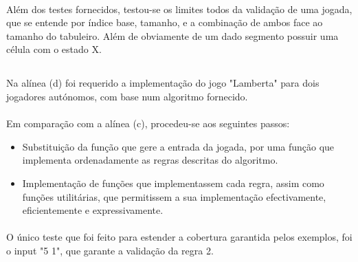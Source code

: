 \paragraph{} Além dos testes fornecidos, testou-se os limites todos da
validação de uma jogada, que se entende por índice base, tamanho, e a
combinação de ambos face ao tamanho do tabuleiro. Além de obviamente de um
dado segmento possuir uma célula com o estado X.

\newpage

\subsection{}

\paragraph{} Na alínea (d) foi requerido a implementação do jogo "Lamberta"
para dois jogadores autónomos, com base num algoritmo fornecido.

\paragraph{} Em comparação com a alínea (c), procedeu-se aos seguintes passos:

\begin{itemize}
\item Substituição da função que gere a entrada da jogada, por uma função
	que implementa ordenadamente as regras descritas do algoritmo.
\item Implementação de funções que implementassem cada regra, assim como
	funções utilitárias, que permitissem a sua implementação efectivamente,
	eficientemente e expressivamente.
\end{itemize}

\paragraph{} O único teste que foi feito para estender a cobertura garantida
pelos exemplos, foi o input "5 1", que garante a validação da regra 2.

